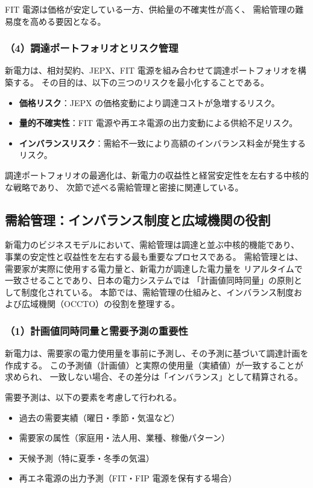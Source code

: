 FIT 電源は価格が安定している一方、供給量の不確実性が高く、
需給管理の難易度を高める要因となる。

\subsubsection{（4）調達ポートフォリオとリスク管理}

新電力は、相対契約、JEPX、FIT 電源を組み合わせて調達ポートフォリオを構築する。
その目的は、以下の三つのリスクを最小化することである。

\begin{itemize}
  \item \textbf{価格リスク}：JEPX の価格変動により調達コストが急増するリスク。
  \item \textbf{量的不確実性}：FIT 電源や再エネ電源の出力変動による供給不足リスク。
  \item \textbf{インバランスリスク}：需給不一致により高額のインバランス料金が発生するリスク。
\end{itemize}

調達ポートフォリオの最適化は、新電力の収益性と経営安定性を左右する中核的な戦略であり、
次節で述べる需給管理と密接に関連している。


\subsection{需給管理：インバランス制度と広域機関の役割}

新電力のビジネスモデルにおいて、需給管理は調達と並ぶ中核的機能であり、
事業の安定性と収益性を左右する最も重要なプロセスである。
需給管理とは、需要家が実際に使用する電力量と、新電力が調達した電力量を
リアルタイムで一致させることであり、日本の電力システムでは
「計画値同時同量」の原則として制度化されている。
本節では、需給管理の仕組みと、インバランス制度および広域機関（OCCTO）の役割を整理する。

\subsubsection{（1）計画値同時同量と需要予測の重要性}

新電力は、需要家の電力使用量を事前に予測し、その予測に基づいて調達計画を作成する。
この予測値（計画値）と実際の使用量（実績値）が一致することが求められ、
一致しない場合、その差分は「インバランス」として精算される。

需要予測は、以下の要素を考慮して行われる。

\begin{itemize}
  \item 過去の需要実績（曜日・季節・気温など）
  \item 需要家の属性（家庭用・法人用、業種、稼働パターン）
  \item 天候予測（特に夏季・冬季の気温）
  \item 再エネ電源の出力予測（FIT・FIP 電源を保有する場合）
\end{itemize}

